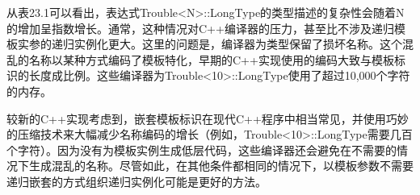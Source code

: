 从表23.1可以看出，表达式Trouble<N>::LongType的类型描述的复杂性会随着N的增加呈指数增长。通常，这种情况对C++编译器的压力，甚至比不涉及递归模板实参的递归实例化更大。这里的问题是，编译器为类型保留了损坏名称。这个混乱的名称以某种方式编码了模板特化，早期的C++实现使用的编码大致与模板标识的长度成比例。这些编译器为Trouble<10>::LongType使用了超过10,000个字符的内存。

较新的C++实现考虑到，嵌套模板标识在现代C++程序中相当常见，并使用巧妙的压缩技术来大幅减少名称编码的增长（例如，Trouble<10>::LongType需要几百个字符）。因为没有为模板实例生成低层代码，这些编译器还会避免在不需要的情况下生成混乱的名称。尽管如此，在其他条件都相同的情况下，以模板参数不需要递归嵌套的方式组织递归实例化可能是更好的方法。

















